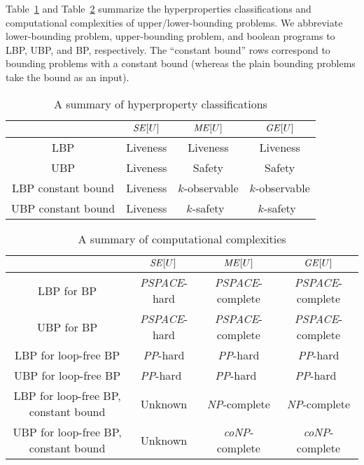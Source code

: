 \documentclass[]{eptcs}
\begin{document}
Table~\ref{fig:hysummary} and Table~\ref{fig:comsummary} summarize the
hyperproperties classifications and computational complexities of
upper/lower-bounding problems.  We abbreviate lower-bounding problem,
upper-bounding problem, and boolean programs to LBP, UBP, and BP,
respectively.  The ``constant bound'' rows correspond to bounding
problems with a constant bound (whereas the plain bounding problems
take the bound as an input).
\begin{table}
\begin{center}
  \begin{tabular}{|c|c|c|c|}
    \hline
    & ${\it SE}[U]$ & ${\it ME}[U]$ & ${\it GE}[U]$\\
    \hline
    LBP& Liveness & Liveness & Liveness\\
    \hline
    UBP& Liveness & Safety & Safety\\
    \hline
    LBP constant bound& Liveness & $k$-observable & $k$-observable\\
    \hline
    UBP constant bound& Liveness & $k$-safety~\cite{DBLP:conf/esorics/YasuokaT10} & $k$-safety~\cite{DBLP:conf/esorics/YasuokaT10}\\
    \hline
\end{tabular}
\end{center}
  \caption{A summary of hyperproperty classifications}
\label{fig:hysummary}
\end{table}
\begin{table}
\begin{center}
  \begin{tabular}{|c|c|c|c|}
    \hline
    & ${\it SE}[U]$ & ${\it ME}[U]$ & ${\it GE}[U]$\\
    \hline
    LBP for BP& {\it PSPACE}-hard& {\it PSPACE}-complete& {\it PSPACE}-complete\\
    \hline
    UBP for BP& {\it PSPACE}-hard & {\it PSPACE}-complete& {\it PSPACE}-complete\\
    \hline
    LBP for loop-free BP& {\it PP}-hard & {\it PP}-hard & {\it PP}-hard\\
    \hline
    UBP for loop-free BP& {\it PP}-hard~\cite{DBLP:conf/esorics/YasuokaT10} & {\it PP}-hard~\cite{DBLP:conf/esorics/YasuokaT10} & {\it PP}-hard~\cite{DBLP:conf/esorics/YasuokaT10}\\
    \hline
    LBP for loop-free BP, constant bound& Unknown & {\it NP}-complete & {\it NP}-complete\\
    \hline
    UBP for loop-free BP, constant bound& Unknown & {\it coNP}-complete & {\it coNP}-complete\\
    \hline
\end{tabular}
\end{center}
\caption{A summary of computational complexities}
\label{fig:comsummary}
\end{table}
\end{document}
